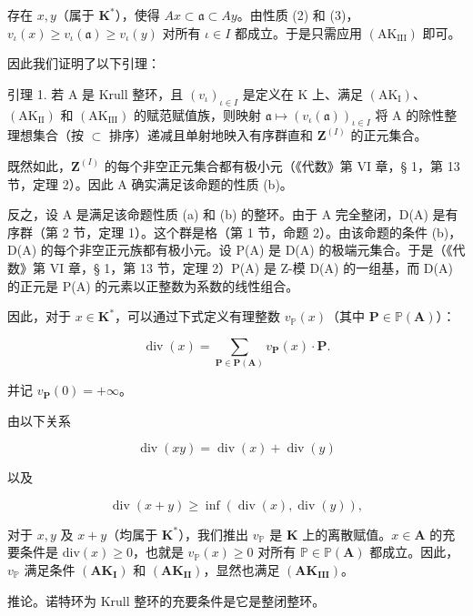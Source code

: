 存在 \(x, y\)（属于 \(\mathbf{K}^*\)），使得 \(Ax \subset \mathfrak{a} \subset Ay\)。由性质 (2) 和 (3)，\(v_{\iota}(x) \geqslant v_{\iota}(\mathfrak{a}) \geqslant v_{\iota}(y)\) 对所有 \(\iota \in I\) 都成立。于是只需应用 \((\mathrm{AK}_{\mathrm{III}})\) 即可。

因此我们证明了以下引理：

引理 1. 若 A 是 Krull 整环，且 \((v_{\iota})_{\iota \in I}\) 是定义在 K 上、满足 \((\mathrm{AK}_{\mathrm{I}})\)、\((\mathrm{AK}_{\mathrm{II}})\) 和 \((\mathrm{AK}_{\mathrm{III}})\) 的赋范赋值族，则映射 \(\mathfrak{a} \mapsto (v_{\iota}(\mathfrak{a}))_{\iota \in I}\) 将 A 的除性整理想集合（按 \(\subset\) 排序）递减且单射地映入有序群直和 \(\mathbf{Z}^{(I)}\) 的正元集合。

既然如此，\(\mathbf{Z}^{(I)}\) 的每个非空正元集合都有极小元（《代数》第 VI 章，§ 1，第 13 节，定理 2）。因此 A 确实满足该命题的性质 (b)。

反之，设 A 是满足该命题性质 (a) 和 (b) 的整环。由于 A 完全整闭，D(A) 是有序群（第 2 节，定理 1）。这个群是格（第 1 节，命题 2）。由该命题的条件 (b)，D(A) 的每个非空正元族都有极小元。设 P(A) 是 D(A) 的极端元集合。于是（《代数》第 VI 章，§ 1，第 13 节，定理 2）P(A) 是 Z-模 D(A) 的一组基，而 D(A) 的正元是 P(A) 的元素以正整数为系数的线性组合。
 
因此，对于 \(x \in \mathbf{K}^*\)，可以通过下式定义有理整数 \(v_{\mathbb{P}}(x)\)（其中 \(\mathbf{P} \in \mathbb{P}(\mathbf{A})\)）：

\[
\operatorname{div} (x) = \sum_ {\mathbf {P} \in \mathbf {P} (\mathbf {A})} v _ {\mathbf {P}} (x) \cdot \mathbf {P}.\tag{4}
\]

并记 \(v_{\mathbf{P}}(0) = +\infty\)。

由以下关系

\[
\operatorname{div} (x y) = \operatorname{div} (x) + \operatorname{div} (y)
\]

以及

\[
\operatorname{div} (x + y) \geqslant \inf (\operatorname{div} (x), \operatorname{div} (y)),
\]

对于 \(x, y\) 及 \(x + y\)（均属于 \(\mathbf{K}^*\)），我们推出 \(v_{\mathbb{P}}\) 是 \(\mathbf{K}\) 上的离散赋值。\(x \in \mathbf{A}\) 的充要条件是 \(\mathrm{div}(x) \geqslant 0\)，也就是 \(v_{\mathbb{P}}(x) \geqslant 0\) 对所有 \(\mathbb{P} \in \mathbb{P}(\mathbf{A})\) 都成立。因此，\(v_{\mathbb{P}}\) 满足条件 \((\mathbf{AK}_{\mathbf{I}})\) 和 \((\mathbf{AK}_{\mathbf{II}})\)，显然也满足 \((\mathbf{AK}_{\mathbf{III}})\)。

推论。诺特环为 Krull 整环的充要条件是它是整闭整环。

